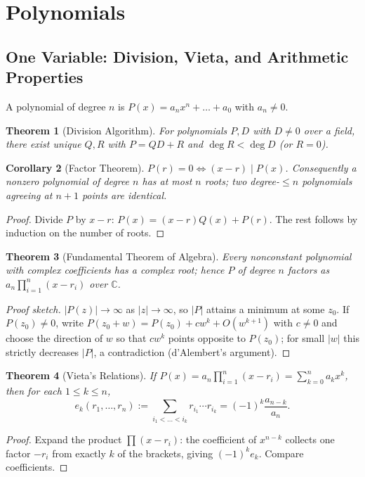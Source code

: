 \documentclass[11pt]{article}
\theoremstyle{plain}
\newtheorem{theorem}{Theorem}[section]
\newtheorem{corollary}[theorem]{Corollary}
\theoremstyle{definition}
\newcommand{\CC}{\mathbb{C}}
\begin{document}
\section{Polynomials}

\subsection{One Variable: Division, Vieta, and Arithmetic Properties}
A polynomial of degree $n$ is $P(x)=a_nx^n+\dots+a_0$ with $a_n\ne 0$.

\begin{theorem}[Division Algorithm]
For polynomials $P, D$ with $D \ne 0$ over a field, there exist unique $Q,R$
with $P = QD + R$ and $\deg R < \deg D$ (or $R=0$).
\end{theorem}

\begin{corollary}[Factor Theorem]
$P(r)=0 \iff (x-r) \mid P(x)$. Consequently a nonzero polynomial of degree $n$
has at most $n$ roots; two degree-$\le n$ polynomials agreeing at $n+1$ points
are identical.
\end{corollary}

\begin{proof}
Divide $P$ by $x - r$: $P(x)=(x-r)Q(x)+P(r)$. The rest follows by induction on the
number of roots.
\end{proof}

\begin{theorem}[Fundamental Theorem of Algebra]
Every nonconstant polynomial with complex coefficients has a complex root;
hence $P$ of degree $n$ factors as $a_n\prod_{i=1}^n (x-r_i)$ over $\CC$.
\end{theorem}

\begin{proof}[Proof sketch]
$|P(z)|\to\infty$ as $|z|\to\infty$, so $|P|$ attains a minimum at some $z_0$.
If $P(z_0)\ne 0$, write $P(z_0+w) = P(z_0) + c w^k + O(w^{k+1})$ with $c\ne0$ and
choose the direction of $w$ so that $cw^k$ points opposite to $P(z_0)$; for small
$|w|$ this strictly decreases $|P|$, a contradiction (d'Alembert's argument).
\end{proof}

\begin{theorem}[Vieta's Relations]
If $P(x)=a_n \prod_{i=1}^{n}(x - r_i) = \sum_{k=0}^n a_k x^k$, then for each $1 \le k \le n$,
\[
e_k(r_1,\dots,r_n) := \sum_{i_1 < \dots < i_k} r_{i_1}\cdots r_{i_k}
= (-1)^k \frac{a_{n-k}}{a_n}.
\]
\end{theorem}
\begin{proof}
Expand the product $\prod (x - r_i)$: the coefficient of $x^{n-k}$ collects one
factor $-r_i$ from exactly $k$ of the brackets, giving $(-1)^k e_k$. Compare
coefficients.
\end{proof}
\end{document}

